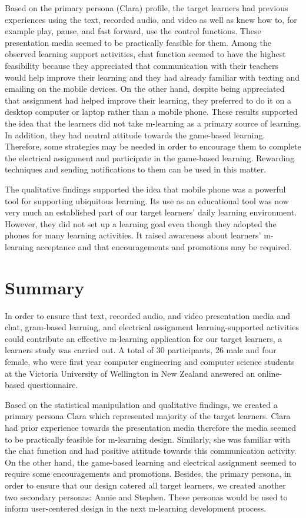 Based on the primary persona (Clara) profile, the target learners had previous experiences using the text, recorded audio, and video as well as knew how to, for example play, pause, and fast forward, use the control functions. These presentation media seemed to be practically feasible for them. Among the observed learning support activities, chat function seemed to have the highest feasibility because they appreciated that communication with their teachers would help improve their learning and they had already familiar with texting and emailing on the mobile devices. On the other hand, despite being appreciated that assignment had helped improve their learning, they preferred to do it on a desktop computer or laptop rather than a mobile phone. These results supported the idea that the learners did not take m-learning as a primary source of learning. In addition, they had neutral attitude towards the game-based learning. Therefore, some strategies may be needed in order to encourage them to complete the electrical assignment and participate in the game-based learning. Rewarding techniques and sending notifications to them can be used in this matter.


The qualitative findings supported the idea that mobile phone was a powerful tool for supporting ubiquitous learning. Its use as an educational tool was now very much an established part of our target learners' daily learning environment. However, they did not set up a learning goal even though they adopted the phones for many learning activities. It raised awareness about learners' m-learning acceptance and that encouragements and promotions may be required. 

\section{Summary}

In order to ensure that text, recorded audio, and video presentation media and chat, gram-based learning, and electrical assignment learning-supported activities could contribute an effective m-learning application for our target learners, a learners study was carried out. A total of 30 participants, 26 male and four female, who were first year computer engineering and computer science students at the Victoria University of Wellington in New Zealand answered an online-based questionnaire. 

Based on the statistical manipulation and qualitative findings, we created a primary persona Clara which represented majority of the target learners. Clara had prior experience towards the presentation media therefore the media seemed to be practically feasible for m-learning design. Similarly, she was familiar with the chat function and had positive attitude towards this communication activity. On the other hand, the game-based learning and electrical assignment seemed to require some encouragements and promotions. Besides, the primary persona, in order to ensure that our design catered all target learners, we created another two secondary personas: Annie and Stephen. These personas would be used to inform user-centered design in the next m-learning development process. 

